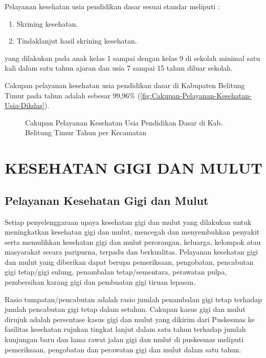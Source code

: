 Pelayanan kesehatan usia pendidikan dasar sesuai standar meliputi :
\begin{enumerate}
    \item Skrining kesehatan.
    \item Tindaklanjut hasil skrining kesehatan.
\end{enumerate}
yang dilakukan pada anak kelas 1 sampai dengan kelas 9 di sekolah minimal satu kali dalam satu tahun ajaran dan usia 7 sampai 15 tahun diluar sekolah.

Cakupan pelayanan kesehatan usia pendidikan dasar di Kabupaten Belitung Timur pada tahun \tP adalah sebesar 99,96\% (\autoref{fig:Cakupan-Pelayanan-Kesehatan-Usia-Dikdas}).

\begin{figure}[H]
    \centering
    \caption{Cakupan Pelayanan Kesehatan Usia Pendidikan Dasar di Kab. Belitung Timur Tahun \tP per Kecamatan}
    \label{fig:Cakupan-Pelayanan-Kesehatan-Usia-Dikdas}
\end{figure}

\section{KESEHATAN GIGI DAN MULUT}
\subsection{Pelayanan Kesehatan Gigi dan Mulut}
Setiap penyelenggaraan upaya kesehatan gigi dan mulut yang dilakukan untuk meningkatkan kesehatan gigi dan mulut, mencegah dan menyembuhkan penyakit serta memulihkan kesehatan gigi dan mulut perorangan, keluarga, kelompok atau masyarakat secara paripurna, terpadu dan berkualitas.
Pelayanan kesehatan gigi dan mulut yang diberikan dapat berupa pemeriksaan, pengobatan, pencabutan gigi tetap/gigi sulung, penambalan tetap/sementara, perawatan pulpa, pembersihan karang gigi dan pembuatan gigi tiruan lepasan.

Rasio tumpatan/pencabutan adalah rasio jumlah penambalan gigi tetap terhadap jumlah pencabutan gigi tetap dalam setahun.
Cakupan kasus gigi dan mulut dirujuk adalah persentase kasus gigi dan mulut yang dikirim dari Puskesmas ke fasilitas kesehatan rujukan tingkat lanjut dalam satu tahun terhadap jumlah kunjungan baru dan lama rawat jalan gigi dan mulut di puskesmas meliputi pemeriksaan, pengobatan dan perawatan gigi dan mulut dalam satu tahun.

